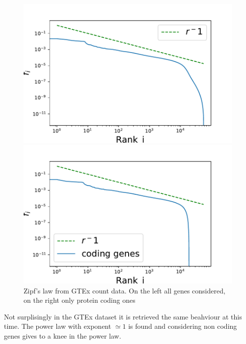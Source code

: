 \begin{figure}[htb!]
    \centering
    \begin{minipage}{0.45\textwidth}
    \includegraphics[width=0.95\linewidth]{pictures/structure/gtex/globalZipf.pdf}
    \end{minipage}
    \hspace{3mm}
    \begin{minipage}{0.45\textwidth}
    \includegraphics[width=0.95\linewidth]{pictures/structure/gtex/globalZipf_c.pdf}
    \end{minipage}
    \caption{Zipf's law from GTEx count data. On the left all genes considered, on the right only protein coding ones}
    \label{fig:my_label}
\end{figure}
Not surplisingly in the GTEx dataset it is retrieved the same beahviour at this time. The power law with exponent $\simeq 1$ is found and considering non coding genes gives to a knee in the power law.

